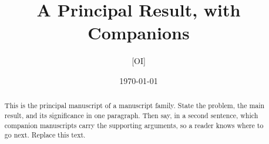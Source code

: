 \documentclass[11pt]{article}
\title{A Principal Result, with Companions}
\author{[OI]}
\date{\today}
\begin{document}
\maketitle

\begin{abstract}
This is the principal manuscript of a manuscript family. State the
problem, the main result, and its significance in one paragraph. Then
say, in a second sentence, which companion manuscripts carry the
supporting arguments, so a reader knows where to go next. Replace this
text.
\end{abstract}

\tableofcontents
\clearpage





\appendix




\end{document}
